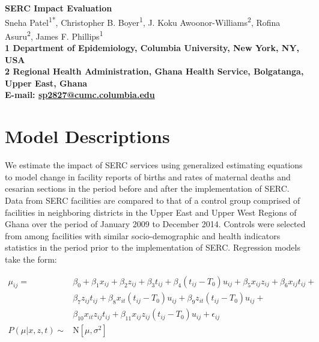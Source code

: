 \documentclass[10pt]{article}
\date{}
\begin{document}
\begin{flushleft}
{\Large
\textbf{SERC Impact Evaluation}
}
\\
  Sneha Patel\textsuperscript{1*},
  Christopher B. Boyer\textsuperscript{1},
  J. Koku Awoonor-Williams\textsuperscript{2},
  Rofina Asuru\textsuperscript{2},
  James F. Phillips\textsuperscript{1}\\
\bf{1} Department of Epidemiology, Columbia University,  New York,  NY,  USA
\\
\bf{2} Regional Health Administration, Ghana Health Service,  Bolgatanga,  Upper East,  Ghana
\\

\textasteriskcentered{} E-mail:   \href{mailto:sp2827@cumc.columbia.edu}{sp2827@cumc.columbia.edu}
  
  
  
  

\end{flushleft}

\section{Model Descriptions}\label{model-descriptions}

We estimate the impact of SERC services using generalized estimating
equations to model change in facility reports of births and rates of
maternal deaths and cesarian sections in the period before and after the
implementation of SERC. Data from SERC facilities are compared to that
of a control group comprised of facilities in neighboring districts in
the Upper East and Upper West Regions of Ghana over the period of
January 2009 to December 2014. Controls were selected from among
facilities with similar socio-demographic and health indicators
statistics in the period prior to the implementation of SERC. Regression
models take the form:

\begin{align}
\mu_{ij} = & \beta_{0} + \beta_{1} x_{ij} + \beta_{2} z_{ij} + \beta_{3} t_{ij} + \beta_{4} (t_{ij} - T_{0})u_{ij} + \beta_{5} x_{ij} z_{ij} + \beta_{6} x_{ij} t_{ij} + \\
           & \beta_{7} z_{ij} t_{ij} + \beta_{8} x_{it} (t_{ij} - T_{0})u_{ij} + \beta_{9} z_{it} (t_{ij} - T_{0})u_{ij} + \nonumber \\
           & \beta_{10} x_{it} z_{ij} t_{ij} + \beta_{11} x_{ij} z_{ij} (t_{ij} - T_{0})u_{ij} + \epsilon_{ij} \nonumber \\
P(\mu | x,z,t) \sim & \textrm{N} [ \mu, \sigma^2 ] \nonumber
\end{align}
\end{document}

